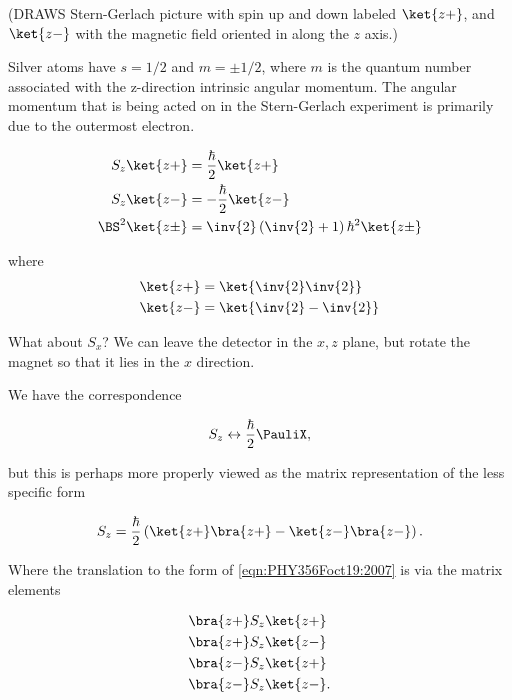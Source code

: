 (DRAWS Stern-Gerlach picture with spin up and down labeled $\ket{z+}$, and $\ket{z-}$ with the magnetic field oriented in along the $z$ axis.)

Silver atoms have $s = 1/2$ and $m= \pm 1/2$, where $m$ is the quantum number associated with the z-direction intrinsic angular momentum.  The angular momentum that is being acted on in the Stern-Gerlach experiment is primarily due to the outermost electron.

\begin{align}\label{eqn:PHY356Foct19:2005}
S_z \ket{z+} &= \frac{\hbar}{2} \ket{z+} \\
S_z \ket{z-} &= -\frac{\hbar}{2} \ket{z-} \\
\BS^2 \ket{z\pm} &= \inv{2} \left( \inv{2} + 1 \right) \hbar^2 \ket{z\pm}
\end{align}

where
\begin{align}\label{eqn:PHY356Foct19:2006}
\ket{z+} &= \ket{ \inv{2} \inv{2} } \\
\ket{z-} &= \ket{ \inv{2} -\inv{2} }
\end{align}


What about $S_x$?  We can leave the detector in the $x,z$ plane, but rotate the magnet so that it lies in the $x$ direction.  

We have the correspondence

\begin{align}\label{eqn:PHY356Foct19:2007}
S_z \leftrightarrow \frac{\hbar}{2} \PauliX,
\end{align}

but this is perhaps more properly viewed as the matrix representation of the less specific form

\begin{align}\label{eqn:PHY356Foct19:2008}
S_z = \frac{\hbar}{2} \left(
\ket{z+} \bra{z+}
-\ket{z-} \bra{z-}
\right).
\end{align}

Where the translation to the form of \ref{eqn:PHY356Foct19:2007} is via the matrix elements

\begin{align}\label{eqn:PHY356Foct19:2020}
&\bra{z+} S_z \ket{z+} \\
&\bra{z+} S_z \ket{z-} \\
&\bra{z-} S_z \ket{z+} \\
&\bra{z-} S_z \ket{z-}.
\end{align}

